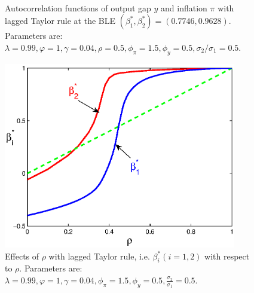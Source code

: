 \begin{figure}
    \begin{center}
        \mbox{\quad
        }
   \end{center}
   \caption{\label{aftrlag} Autocorrelation functions of output gap $y$ and inflation $\pi$ with lagged Taylor rule at the BLE $(\beta_1^*,
   \beta_2^*)=(0.7746, 0.9628)$. Parameters are: $\lambda=0.99, \varphi=1, \gamma=0.04, \rho=0.5, \phi_\pi=1.5,\phi_y=0.5, \sigma_{2}/\sigma_1=0.5$.}
    \end{figure}
    
    \begin{figure}
    \begin{center}
    \includegraphics[width=4in]{blerhotrlag.eps}
   \end{center}
   \caption{ \label{blerhotrlag} Effects of $\rho$ with lagged Taylor rule, i.e. $\beta^*_i (i=1,2)$ with respect to $\rho$. Parameters are: $\lambda=0.99, \varphi=1, \gamma=0.04, \phi_\pi=1.5,\phi_y=0.5, \frac{\sigma_2}{\sigma_1}=0.5$. }
    \end{figure}

